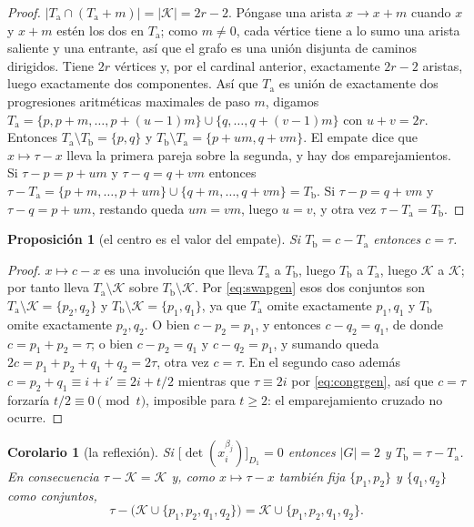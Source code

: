 \documentclass[11pt,reqno]{amsart}
\theoremstyle{plain}
\newtheorem{corollary}[theorem]{Corolario}
\newtheorem{proposition}[theorem]{Proposición}
\theoremstyle{definition}
\begin{document}
\begin{proof}
$|T_{\mathrm a}\cap(T_{\mathrm a}+m)|=|\mathcal{K}|=2r-2$. Póngase una arista $x\to x+m$ cuando $x$ y
$x+m$ estén los dos en $T_{\mathrm a}$; como $m\ne0$, cada vértice tiene a lo sumo una arista
saliente y una entrante, así que el grafo es una unión disjunta de caminos dirigidos. Tiene $2r$
vértices y, por el cardinal anterior, exactamente $2r-2$ aristas, luego exactamente dos componentes.
Así que $T_{\mathrm a}$ es unión de exactamente dos progresiones aritméticas maximales de paso $m$,
digamos $T_{\mathrm a}=\{p,p+m,\dots,p+(u-1)m\}\cup\{q,\dots,q+(v-1)m\}$ con $u+v=2r$. Entonces
$T_{\mathrm a}\setminus T_{\mathrm b}=\{p,q\}$ y $T_{\mathrm b}\setminus T_{\mathrm a}=\{p+um,q+vm\}$.
El empate dice que $x\mapsto\tau-x$ lleva la primera pareja sobre la segunda, y hay dos
emparejamientos. Si $\tau-p=p+um$ y $\tau-q=q+vm$ entonces
$\tau-T_{\mathrm a}=\{p+m,\dots,p+um\}\cup\{q+m,\dots,q+vm\}=T_{\mathrm b}$. Si $\tau-p=q+vm$ y
$\tau-q=p+um$, restando queda $um=vm$, luego $u=v$, y otra vez
$\tau-T_{\mathrm a}=T_{\mathrm b}$.
\end{proof}

\begin{proposition}[el centro es el valor del empate]\label{prop:centregen}
Si $T_{\mathrm b}=c-T_{\mathrm a}$ entonces $c=\tau$.
\end{proposition}

\begin{proof}
$x\mapsto c-x$ es una involución que lleva $T_{\mathrm a}$ a $T_{\mathrm b}$, luego $T_{\mathrm b}$ a
$T_{\mathrm a}$, luego $\mathcal{K}$ a $\mathcal{K}$; por tanto lleva
$T_{\mathrm a}\setminus\mathcal{K}$ sobre $T_{\mathrm b}\setminus\mathcal{K}$. Por \eqref{eq:swapgen}
esos dos conjuntos son $T_{\mathrm a}\setminus\mathcal{K}=\{p_2,q_2\}$ y
$T_{\mathrm b}\setminus\mathcal{K}=\{p_1,q_1\}$, ya que $T_{\mathrm a}$ omite exactamente $p_1,q_1$ y
$T_{\mathrm b}$ omite exactamente $p_2,q_2$. O bien $c-p_2=p_1$, y entonces $c-q_2=q_1$, de donde
$c=p_1+p_2=\tau$; o bien $c-p_2=q_1$ y $c-q_2=p_1$, y sumando queda
$2c=p_1+p_2+q_1+q_2=2\tau$, otra vez $c=\tau$. En el segundo caso además
$c=p_2+q_1\equiv i+i'\equiv2i+t/2$ mientras que $\tau\equiv2i$ por \eqref{eq:congrgen}, así que
$c=\tau$ forzaría $t/2\equiv0\pmod t$, imposible para $t\ge2$: el emparejamiento cruzado no ocurre.
\end{proof}

\begin{corollary}[la reflexión]\label{cor:reflectgen}
Si $\bigl[\det(x_i^{\beta_j})\bigr]_{D_1}=0$ entonces $|G|=2$ y $T_{\mathrm b}=\tau-T_{\mathrm a}$.
En consecuencia $\tau-\mathcal{K}=\mathcal{K}$ y, como $x\mapsto\tau-x$ también fija $\{p_1,p_2\}$ y
$\{q_1,q_2\}$ como conjuntos,
\begin{equation}\label{eq:Ssymgen}
  \tau-\bigl(\mathcal{K}\cup\{p_1,p_2,q_1,q_2\}\bigr)=\mathcal{K}\cup\{p_1,p_2,q_1,q_2\}.
\end{equation}
\end{corollary}
\end{document}
